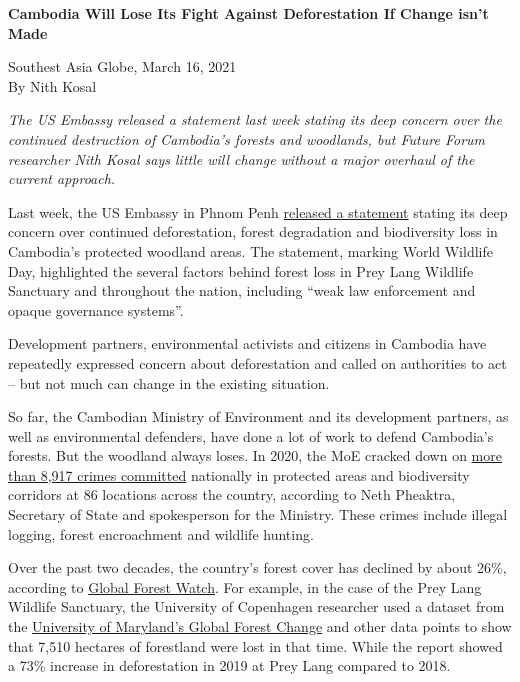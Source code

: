 \documentclass[10pt,a4paper]{letter}
\begin{document}
	
{\Large 
	\textbf{Cambodia Will Lose Its Fight Against Deforestation If Change isn't Made}
} 

Southest Asia Globe, March 16, 2021 \\
By Nith Kosal

\textit{The US Embassy released a statement last week stating its deep concern over the continued destruction of Cambodia's forests and woodlands, but Future Forum researcher Nith Kosal says little will change without a major overhaul of the current approach.}

Last week, the US Embassy in Phnom Penh \href{https://kh.usembassy.gov/u-s-embassy-phnom-penh-cambodia-statement-on-prey-lang-wildlife-sanctuary/}{released a statement} stating its deep concern over continued deforestation, forest degradation and biodiversity loss in Cambodia's protected woodland areas. The statement, marking World Wildlife Day, highlighted the several factors behind forest loss in Prey Lang Wildlife Sanctuary and throughout the nation, including ``weak law enforcement and opaque governance systems''.


Development partners, environmental activists and citizens in Cambodia have repeatedly expressed concern about deforestation and called on authorities to act -- but not much can change in the existing situation.

So far, the Cambodian Ministry of Environment and its development partners, as well as environmental defenders, have done a lot of work to defend Cambodia's forests. But the woodland always loses. In 2020, the MoE cracked down on \href{https://thmeythmey.com/?page=detail&id=100708}{more than 8,917 crimes committed} nationally in protected areas and biodiversity corridors at 86 locations across the country, according to Neth Pheaktra, Secretary of State and spokesperson for the Ministry. These crimes include illegal logging, forest encroachment and wildlife hunting.

Over the past two decades, the country's forest cover has declined by about 26\%, according to \href{https://www.globalforestwatch.org/dashboards/country/KHM/}{Global Forest Watch}. For example, in the case of the Prey Lang Wildlife Sanctuary, the University of Copenhagen researcher used a dataset from the \href{https://www.voacambodia.com/a/govt-usaid-criticized-for-inaction-over-severe-forest-loss-at-prey-lang-sanctuary/5478565.html}{University of Maryland's Global Forest Change} and other data points to show that 7,510 hectares of forestland were lost in that time. While the report showed a 73\% increase in deforestation in 2019 at Prey Lang compared to 2018.
\end{document}
